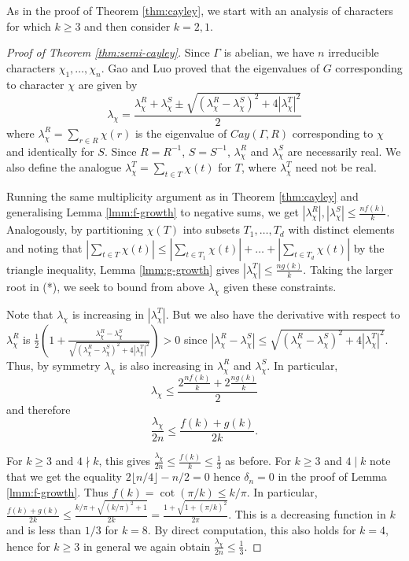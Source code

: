 \documentclass[12pt]{article}
\newcommand{\floor}[1]{\lfloor{#1\rfloor}}
\begin{document}
As in the proof of Theorem \ref{thm:cayley}, we start with an analysis of characters for which $k \ge 3$ and then consider $k = 2, 1$. 

\begin{proof}[Proof of Theorem \ref{thm:semi-cayley}]
    Since $\Gamma$ is abelian, we have $n$ irreducible characters $\chi_1, \dots, \chi_n$. Gao and Luo \cite{GaoSemiCayley} proved that the eigenvalues of $G$ corresponding to character $\chi$ are given by
    \[\lambda_\chi = \frac{\lambda_\chi^R + \lambda_\chi^S \pm \sqrt{(\lambda_\chi^R - \lambda_\chi^S)^2 + 4|\lambda_\chi^T|^2}}{2} \tag{*}\]
    where $\lambda_\chi^R = \sum_{r \in R} \chi(r)$ is the eigenvalue of $Cay(\Gamma, R)$ corresponding to $\chi$ and identically for $S$. Since $R = R^{-1}$, $S = S^{-1}$, $\lambda_\chi^R$ and $\lambda_\chi^S$ are necessarily real. We also define the analogue $\lambda_\chi^T = \sum_{t \in T} \chi(t)$ for $T$, where $\lambda_\chi^T$ need not be real. 

    Running the same multiplicity argument as in Theorem \ref{thm:cayley} and generalising Lemma \ref{lmm:f-growth} to negative sums, we get $|\lambda_\chi^R|, |\lambda_\chi^S| \le \frac{nf(k)}{k}$. Analogously, by partitioning $\chi(T)$ into subsets $T_1, \dots, T_d$ with distinct elements and noting that $|\sum_{t \in T} \chi(t)| \le |\sum_{t \in T_1} \chi(t)| + \dots + |\sum_{t \in T_d} \chi(t)|$ by the triangle inequality, Lemma \ref{lmm:g-growth} gives $|\lambda_\chi^T| \le \frac{ng(k)}{k}$. Taking the larger root in (*), we seek to bound from above $\lambda_\chi$ given these constraints. 

    Note that $\lambda_\chi$ is increasing in $|\lambda_\chi^T|$. But we also have the derivative with respect to $\lambda_\chi^R$ is $\frac12 (1 + \frac{\lambda_\chi^R - \lambda_\chi^S}{\sqrt{(\lambda_\chi^R - \lambda_\chi^S)^2 + 4|\lambda_\chi^T|^2}}) > 0$ since $|\lambda_\chi^R - \lambda_\chi^S| \le \sqrt{(\lambda_\chi^R - \lambda_\chi^S)^2 + 4|\lambda_\chi^T|^2}$. Thus, by symmetry $\lambda_\chi$ is also increasing in $\lambda_\chi^R$ and $\lambda_\chi^S$. In particular, \[\lambda_\chi \le \frac{2\frac{nf(k)}{k} + 2\frac{ng(k)}{k}}{2}\]
    and therefore
    \[\frac{\lambda_\chi}{2n} \le \frac{f(k) + g(k)}{2k}.\] 

    For $k \ge 3$ and $4 \nmid k$, this gives $\frac{\lambda_\chi}{2n} \le \frac{f(k)}{k} \le \frac13$ as before. For $k \ge 3$ and $4 \mid k$ note that we get the equality $2\floor{n/4} - n/2 = 0$ hence $\delta_n = 0$ in the proof of Lemma \ref{lmm:f-growth}. Thus $f(k) = \cot(\pi/k) \le k/\pi$. In particular, $\frac{f(k) + g(k)}{2k} \le \frac{k/\pi + \sqrt{(k/\pi)^2 + 1}}{2k} = \frac{1 + \sqrt{1 + (\pi/k)^2}}{2\pi}$. This is a decreasing function in $k$ and is less than $1/3$ for $k = 8$. By direct computation, this also holds for $k = 4$, hence for $k \ge 3$ in general we again obtain $\frac{\lambda_\chi}{2n} \le \frac13$. 


\end{proof}
\end{document}
